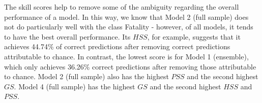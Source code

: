 \documentclass[]{elsarticle} %
\begin{document}
The skill scores help to remove some of the ambiguity regarding the
overall performance of a model. In this way, we know that Model 2 (full
sample) does not do particularly well with the class Fatality - however,
of all models, it tends to have the best overall performance. Its
\(HSS\), for example, suggests that it achieves 44.74\% of correct
predictions after removing correct predictions attributable to chance.
In contrast, the lowest score is for Model 1 (ensemble), which only
achieves 36.26\% correct predictions after removing those attributable
to chance. Model 2 (full sample) also has the highest \(PSS\) and the
second highest \(GS\). Model 4 (full sample) has the highest \(GS\) and
the second highest \(HSS\) and \(PSS\).

\begin{table}

\caption{\label{tab:nowcast-outcomes-assessment}\label{tab:nowcast-outcomes-assessment}Assessment of in-sample outcomes (nowcasting using 2017 data set, i.e., estimation data set)}
\centering
{}
\end{table}
\end{document}
